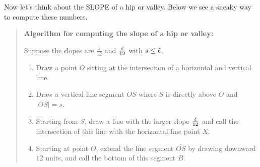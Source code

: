 \documentclass[hints,nooutcomes,noauthor,handout]{ximera}
\begin{document}
\begin{question}
  Now let's think about the SLOPE of a hip or valley. Below we see a
  sneaky way to compute these numbers.
  \begin{mdframed}[style=OutcomeStyle]
\begin{quote}
  \textbf{Algorithm for computing the slope of a hip or valley:}

  Suppose the slopes are $\frac{s}{12}$ and $\frac{\ell}{12}$ with
$s\le \ell$.

\begin{enumerate}
\item Draw a point $O$ sitting at the intersection of a horizontal
  and vertical line.
\item Draw a vertical line segment $\bar{OS}$ where $S$ is directly
  above $O$ and $|OS| = s$.
  \item Starting from $S$, draw a line with the larger slope
    $\frac{\ell}{12}$ and call the intersection of this line with the
    horizontal line point $X$.
  \item Starting at point $O$, extend the line segment $\bar{OS}$ by
    drawing downward $12$ units, and call the bottom of this segment
    $B$.
     \begin{center}
\end{center}
\end{enumerate}
\end{quote}
\end{mdframed}
\end{question}
\end{document}
